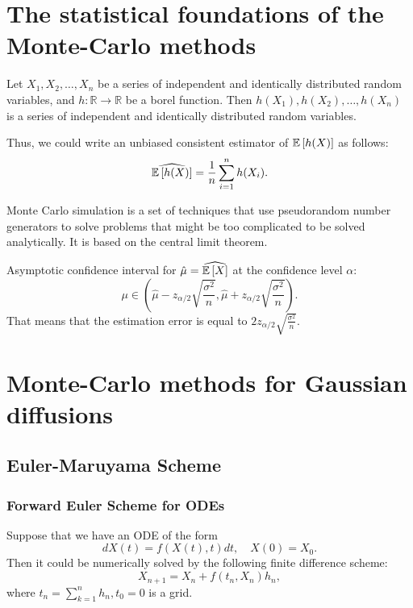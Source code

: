     \section{The statistical foundations of the Monte-Carlo methods}
        \begin{lemma}
            Let $X_1, X_2, \dots, X_n$ be a series of independent and identically distributed random variables, and $h: \mathbb{R} \to \mathbb{R}$ be a borel function. Then $h(X_1), h(X_2), \dots, h(X_n)$ is a series of independent and identically distributed random variables.
        \end{lemma}
        Thus, we could write an unbiased consistent estimator of $\mathbb{E} \left[h(X)\right]$ as follows:
        \begin{equation}
            \widehat{\mathbb{E} \left[h(X)\right]} = \frac{1}{n} \sum_{i=1}^n h(X_i).
        \end{equation}
        \begin{definition}
            Monte Carlo simulation is a set of techniques that use pseudorandom number generators to solve problems that might be too complicated to be solved analytically. It is based on the central limit theorem.
        \end{definition}
        Asymptotic confidence interval for $\hat{\mu} = \widehat{\mathbb{E}\left[X\right]}$ at the confidence level $\alpha$:
        \begin{equation}
            \mu \in \left(\hat{\mu} - z_{\alpha/2} \sqrt{\frac{\sigma^2}{n}}, \hat{\mu} + z_{\alpha/2} \sqrt{\frac{\sigma^2}{n}}\right).
        \end{equation}
        That means that the estimation error is equal to $2z_{\alpha/2} \sqrt{\frac{\sigma^2}{n}}$.

    \section{Monte-Carlo methods for Gaussian diffusions}
        \subsection{Euler-Maruyama Scheme}
            \subsubsection{Forward Euler Scheme for ODEs}
                Suppose that we have an ODE of the form
                \begin{equation}
                    dX(t) = f(X(t), t)dt, \quad X(0) = X_0. \label{eq:ode1}
                \end{equation}
                Then it could be numerically solved by the following finite difference scheme:
                \begin{equation}
                    X_{n+1} = X_n + f(t_n, X_n)h_n, \label{Euler:ODE}
                \end{equation}
                where $t_n = \sum_{k=1}^n h_n, t_0 = 0$ is a grid. 

